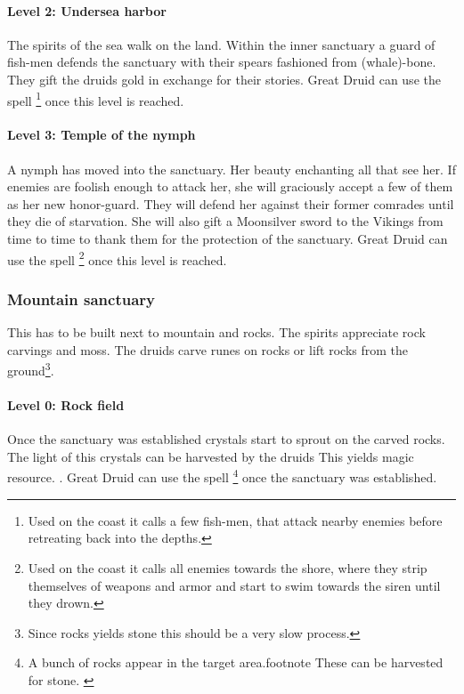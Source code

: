 \paragraph{Level 2: Undersea harbor}
The spirits of the sea walk on the land. Within the inner sanctuary a guard of
fish-men defends the sanctuary with their spears fashioned from (whale)-bone.
They gift the druids gold in exchange for their stories. Great Druid can use
the spell \footnote{ Used on the coast it calls a few
	fish-men, that attack nearby enemies before retreating back into the depths. }
once this level is reached.

\paragraph{Level 3: Temple of the nymph}
A nymph has moved into the sanctuary. Her beauty enchanting all that see her.
If enemies are foolish enough to attack her, she will graciously accept a few
of them as her new honor-guard. They will defend her against their former
comrades until they die of starvation. She will also gift a Moonsilver sword to
the \gls*{Vikings} from time to time to thank them for the protection of the
sanctuary. Great Druid can use the spell \footnote{ Used
	on the coast it calls all enemies towards the shore, where they strip
	themselves of weapons and armor and start to swim towards the siren until they
	drown. } once this level is reached.

\subsubsection{Mountain sanctuary}\label{ch:Tribes:Vikings:Religion:Mountain}
This has to be built next to mountain and rocks. The spirits appreciate rock
carvings and moss. The druids carve runes on rocks or lift rocks from the
ground\footnote{ Since rocks yields stone this should be a very slow process.
}.

\paragraph{Level 0: Rock field}
Once the sanctuary was established crystals start to sprout on the carved
rocks. The light of this crystals can be harvested by the druids{ This yields
		magic resource. }. Great Druid can use the spell \footnote{ A bunch of rocks appear in the target area.footnote{ These can
			be harvested for stone. } } once the sanctuary was established.

